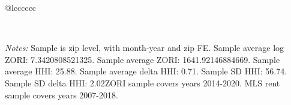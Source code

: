 \begin{table}[H]
{\begin{tabular}{@{\extracolsep{5pt}}lcccccc}
 \hline  

 \hline \\[-1.8ex]  

  {\parbox[t]{\textwidth}{ \textit{Notes:} Sample is zip level, with month-year and zip FE. Sample average log ZORI: 7.3420808521325. Sample average ZORI: 1641.92146884669. Sample average HHI: 25.88. Sample average delta HHI: 0.71. Sample SD HHI: 56.74. Sample SD delta HHI: 2.02ZORI sample covers years 2014-2020. MLS rent sample covers years 2007-2018.}} \\ 

 \end{tabular}}  

 \end{table}  

 




